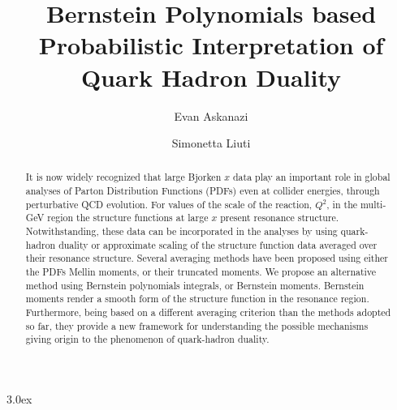 \documentclass[
twocolumn,
aps,prd,
nofootinbib,
superscriptaddress,
showpacs,ligh
tightenlines, 
]{revtex4}
\begin{document}
\title  {Bernstein Polynomials based Probabilistic Interpretation of Quark Hadron Duality}

\author{Evan Askanazi}

\author{Simonetta Liuti }


 \begin{abstract}
It is now widely recognized that large Bjorken $x$ data play an important role in global analyses of Parton Distribution Functions (PDFs) even at collider energies, through perturbative QCD evolution. 
For values of the scale of the reaction, $Q^2$, in the multi-GeV region the structure functions at large $x$ present resonance structure. Notwithstanding, these data can be incorporated in the analyses by using quark-hadron duality or approximate scaling of the structure function data averaged over their resonance structure. Several averaging methods have been proposed using either the PDFs Mellin moments, or their truncated moments. We propose an alternative method using Bernstein polynomials integrals, or Bernstein moments. Bernstein moments render a smooth form of the structure function in the resonance region. Furthermore, being based on a different averaging criterion than the methods adopted so far, they provide a new framework for understanding the possible mechanisms giving origin to the phenomenon of quark-hadron duality.     
\end{abstract}

\maketitle

\baselineskip 3.0ex
\end{document}
